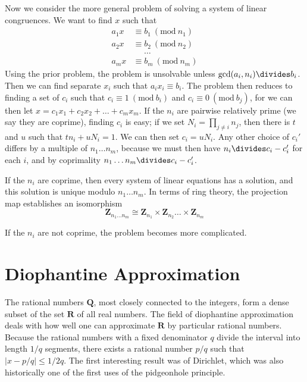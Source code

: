 Now we consider the more general problem of solving a system of linear congruences. We want to find $x$ such that
%
\begin{align*}
    a_1x &\equiv b_1\ (\text{mod}\ n_1)\\
    a_2x &\equiv b_2\ (\text{mod}\ n_2)\\
    &\ \ \ \ \ \ \dots\\
    a_mx &\equiv b_m\ (\text{mod}\ n_m)
\end{align*}
%
Using the prior problem, the problem is unsolvable unless $\gcd(a_i, n_i) \divides b_i$. Then we can find separate $x_i$ such that $a_ix_i \equiv b_i$. The problem then reduces to finding a set of $c_i$ such that $c_i \equiv 1\ (\text{mod}\ b_i)$ and $c_i \equiv 0\ (\text{mod}\ b_j)$, for we can then let $x = c_1 x_1 + c_2 x_2 + \dots + c_m x_m$. If the $n_i$ are pairwise relatively prime (we say they are coprime), finding $c_i$ is easy; if we set $N_i = \prod_{j \neq i} n_j$, then there is $t$ and $u$ such that $tn_i + uN_i = 1$. We can then set $c_i = uN_i$. Any other choice of $c_i'$ differs by a multiple of $n_1 \dots n_m$, because we must then have $n_i \divides c_i - c_i'$ for each $i$, and by coprimality $n_1 \dots n_m \divides c_i - c_i'$.

\begin{theorem}
    If the $n_i$ are coprime, then every system of linear equations has a solution, and this solution is unique modulo $n_1 \dots n_m$. In terms of ring theory, the projection map establishes an isomorphism
    \[ \mathbf{Z}_{n_1 \dots n_m} \cong \mathbf{Z}_{n_1} \times \mathbf{Z}_{n_2} \dots \times \mathbf{Z}_{n_m} \]
\end{theorem}

If the $n_i$ are not coprime, the problem becomes more complicated.

\chapter{Diophantine Approximation}

The rational numbers $\mathbf{Q}$, most closely connected to the integers, form a dense subset of the set $\mathbf{R}$ of all real numbers. The field of diophantine approximation deals with how well one can approximate $\mathbf{R}$ by particular rational numbers. Because the rational numbers with a fixed denominator $q$ divide the interval into length $1/q$ segments, there exists a rational number $p/q$ such that $|x - p/q| \leq 1/2q$. The first interesting result was of Dirichlet, which was also historically one of the first uses of the pidgeonhole principle.

